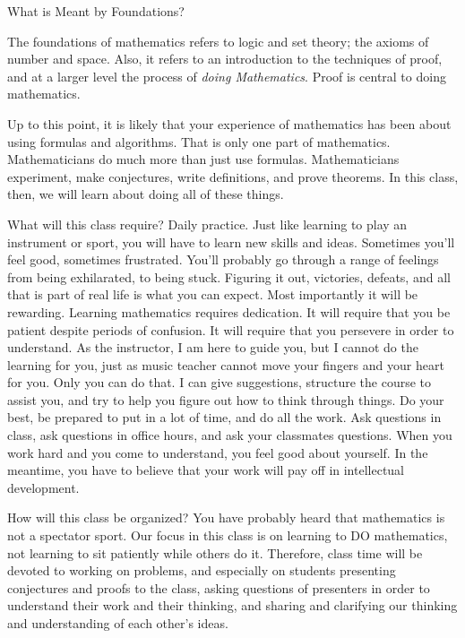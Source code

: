 \begin{section*}{What is Meant by Foundations?}

The foundations of mathematics refers to logic and set theory; the axioms of number and space.  Also, it refers to an introduction to the techniques of proof, and at a larger level the process of \emph{doing Mathematics}.  Proof is central to doing mathematics.

Up to this point, it is likely that your experience of mathematics has been about using formulas and algorithms. That is only one part of mathematics. Mathematicians do much more than just use formulas.  Mathematicians experiment, make conjectures, write definitions, and prove theorems.  In this class, then, we will learn about doing all of these things.

What will this class require?  Daily practice.  Just like learning to play an instrument or sport, you will have to learn new skills and ideas.  Sometimes you'll feel good, sometimes frustrated.  You'll probably go through a range of feelings from being exhilarated, to being stuck.  Figuring it out, victories, defeats, and all that is part of real life is what you can expect.  Most importantly it will be rewarding.  Learning mathematics requires dedication.  It will require that you be patient despite periods of confusion.  It will require that you persevere in order to understand.  As the instructor, I am here to guide you, but I cannot do the learning for you, just as music teacher cannot move your fingers and your heart for you.  Only you can do that.  I can give suggestions, structure the course to assist you, and try to help you figure out how to think through things.  Do your best, be prepared to put in a lot of time, and do all the work.  Ask questions in class, ask questions in office hours, and ask your classmates questions.  When you work hard and you come to understand, you feel good about yourself.  In the meantime, you have to believe that your work will pay off in intellectual development.

How will this class be organized?  You have probably heard that mathematics is not a spectator sport.  Our focus in this class is on learning to DO mathematics, not learning to sit patiently while others do it.  Therefore, class time will be devoted to working on problems, and especially on students presenting conjectures and proofs to the class, asking questions of presenters in order to understand their work and their thinking, and sharing and clarifying our thinking and understanding of each other's ideas.  


\end{section*}
